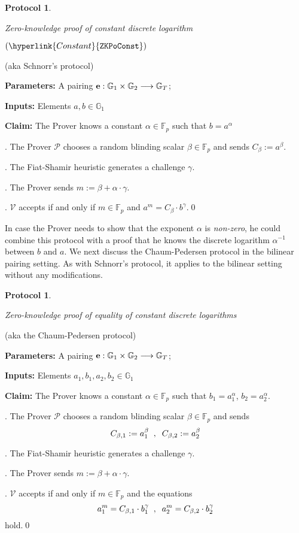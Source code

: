 \documentclass[11pt, lettersize, notitlepage, leqno, footskip=0.6cm]{article}
\newcommand{\bFp}{\mathbb{F}_p}
\newcommand{\lra}{\longrightarrow}
\newcommand{\mc}{\mathcal}
\newcommand{\mb}{\mathbb}
\newcommand{\al}{\alpha}
\newcommand{\be}{\beta}
\newcommand{\mP}{\mc{P}}
\newcommand{\V}{\mc{V}}
\newcommand{\vs}{\vspace{-0.15cm}}
\newcommand{\noin}{\noindent}
\newtheorem{Prot}[Thm]{Protocol}
\numberwithin{equation}{section}
\begin{document}
\begin{mdframed}
\begin{Prot} \hypertarget{Const}{Zero-knowledge proof of constant discrete logarithm}  $(\hyperlink{Constant}{\tt{ZKPoConst}})$\end{Prot}  

\noin (aka Schnorr's protocol)

\noindent \textbf{Parameters:} A pairing ${\bf{e}}:\mb{G}_1\times \mb{G}_2\lra \mb{G}_T$;

\noindent \textbf{Inputs:} Elements $a, b\in \mb{G}_1$

\noin \textbf{Claim:} The Prover knows a constant $\al \in \bFp$ such that $b = a^{\al}$ \vspace{2mm}

\noin 1. The Prover $\mP$ chooses a random blinding scalar $\be\in \bFp$ and sends $C_{\be}:= a^{\be}$.

\noin 2. The Fiat-Shamir heuristic generates a challenge $\gamma$.

\noin 3. The Prover sends $m := \be + \al\cdot \gamma $.

\noin 4. $\V$ accepts if and only if $m\in \bFp$ and $a^{m} = C_{\be}\cdot b^{\gamma}$.\qed \end{mdframed}

\bigskip

In case the Prover needs to show that the exponent $\al$ is \textit{non-zero}, he could combine this protocol with a proof that he knows the discrete logarithm $\al^{-1}$ between $b$ and $a$. We next discuss the Chaum-Pedersen protocol in the bilinear pairing setting. As with Schnorr's protocol, it applies to the bilinear setting without any modifications.


\bigskip




\begin{mdframed}
\begin{Prot} \hypertarget{CP}{Zero-knowledge proof of equality of constant discrete logarithms}  \end{Prot}  

\noin (aka the Chaum-Pedersen protocol)

\noindent \textbf{Parameters:} A pairing ${\bf{e}}:\mb{G}_1\times \mb{G}_2\lra \mb{G}_T$;

\noindent \textbf{Inputs:} Elements $a_1, b_1, a_2, b_2\in \mb{G}_1$

\noin \textbf{Claim:} The Prover knows a constant $\al \in \bFp$ such that $b_1 = a_1^{\al}$, $b_2 = a_2^{\al}$. \vspace{2mm}

\noin 1. The Prover $\mP$ chooses a random blinding scalar $\be\in \bFp$ and sends \vs $$C_{\be,1}:= a_1^{\be}\;\;,\;\;C_{\be,2}:= a_2^{\be} \vs $$

\noin 2. The Fiat-Shamir heuristic generates a challenge $\gamma$.

\noin 3. The Prover sends $m := \be + \al\cdot \gamma $.

\noin 4. $\V$ accepts if and only if $m\in \bFp$ and the equations \vs $$ a_1^{m} = C_{\be,1}\cdot b_1^{\gamma}\;\;,\;\;a_2^{m} = C_{\be,2}\cdot b_2^{\gamma} \vs $$ hold.\qed \end{mdframed}
\end{document}
